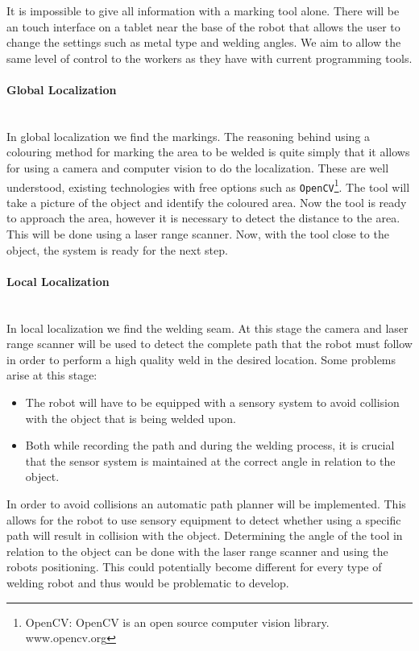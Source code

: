 It is impossible to give all information with a marking tool alone.
There will be an touch interface on a tablet near the base of the robot that allows the user to change the settings such as metal type and welding angles. 
We aim to allow the same level of control to the workers as they have with current programming tools.
\paragraph*{Global Localization}~\\
In global localization we find the markings.
The reasoning behind using a colouring method for marking the area to be welded is quite simply that it allows for using a camera and computer vision to do the localization. 
These are well understood, existing technologies with free options such as \texttt{OpenCV}\footnote{OpenCV: OpenCV is an open source computer vision library. www.opencv.org}. 
The tool will take a picture of the object and identify the coloured area. 
Now the tool is ready to approach the area, however it is necessary to detect the distance to the area. 
This will be done using a laser range scanner. Now, with the tool close to the object, the system is ready for the next step.
\paragraph*{Local Localization}~\\
In local localization we find the welding seam.
At this stage the camera and laser range scanner will be used to detect the complete path that the robot must follow in order to perform a high quality weld in the desired location. 
Some problems arise at this stage:
\begin{itemize}
	\item[] The robot will have to be equipped with a sensory system to avoid collision with the object that is being welded upon. 
	\item[] Both while recording the path and during the welding process, it is crucial that the sensor system is maintained at the correct angle in relation to the object. 
\end{itemize}
In order to avoid collisions an automatic path planner will be implemented. This allows for the robot to use sensory equipment to detect whether using a specific path will result in collision with the object.
Determining the angle of the tool in relation to the object can be done with the laser range scanner and using the robots positioning. This could potentially become different for every type of welding robot and thus would be problematic to develop.


